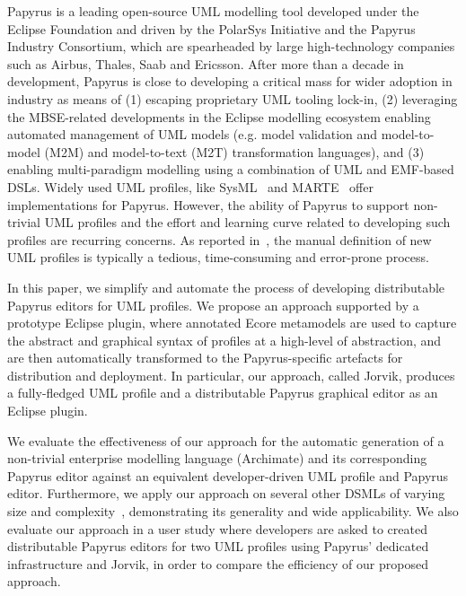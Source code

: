 Papyrus \cite{lanusse2009papyrus} is a leading open-source UML modelling tool developed under the Eclipse Foundation and driven by the PolarSys Initiative and the Papyrus Industry Consortium, which are spearheaded by large high-technology companies such as Airbus, Thales, Saab and Ericsson.  
After more than a decade in development, Papyrus is close to developing a critical mass for wider adoption in industry as means of (1) escaping proprietary UML tooling lock-in, (2) leveraging the MBSE-related developments in the Eclipse modelling ecosystem enabling automated management of UML models (e.g. model validation and model-to-model (M2M) and model-to-text (M2T) transformation languages), and (3) enabling multi-paradigm modelling using a combination of UML and EMF-based DSLs. 
Widely used UML profiles, like SysML~\cite{friedenthal2014practical} and MARTE~\cite{omg2011marte} offer implementations for Papyrus. 
However, the ability of Papyrus to support non-trivial UML profiles and the effort and learning curve related to developing such profiles are recurring concerns. 
As reported in~\cite{Wimmer2009:IJWIS}, the manual definition of new UML profiles is typically a tedious, time-consuming and error-prone process.

In this paper, we simplify and automate the process of developing distributable Papyrus editors for UML profiles. 
We propose an approach supported by a prototype Eclipse plugin, where annotated Ecore metamodels are used to capture the abstract and graphical syntax of profiles at a high-level of abstraction, and are then automatically transformed to the Papyrus-specific artefacts for distribution and deployment. 
In particular, our approach, called Jorvik, produces a fully-fledged UML profile and a distributable Papyrus graphical editor as an Eclipse plugin. 

We evaluate the effectiveness of our approach for the automatic generation of a non-trivial enterprise modelling language (Archimate) and its corresponding Papyrus editor against an equivalent developer-driven UML profile and Papyrus editor. 
Furthermore, we apply our approach on several other DSMLs of varying size and complexity~\cite{williams2013metamodels}, demonstrating its generality and wide applicability. We also evaluate our approach in a user study where developers are asked to created distributable Papyrus editors for two UML profiles using Papyrus' dedicated infrastructure and Jorvik, in order to compare the efficiency of our proposed approach.

